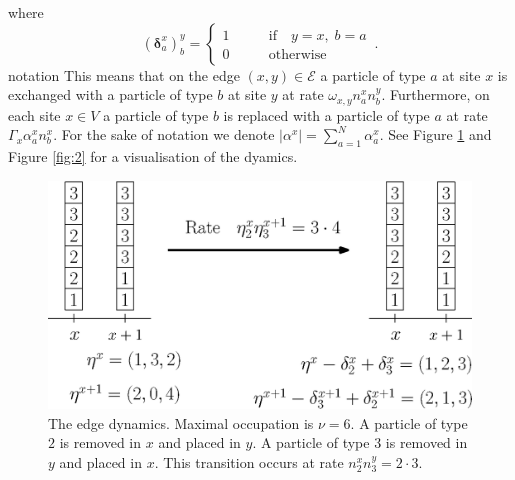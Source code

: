 \documentclass[10pt]{article}
\numberwithin{equation}{section}
\numberwithin{equation}{subsection}
\begin{document}
where 
\begin{equation}
(\bm{\delta}_{a}^{x})^{y}_{b}=\begin{cases}
1\qquad &\text{if}\quad y=x,\;b=a\\
0\qquad &\text{otherwise}
\end{cases}\,.
\end{equation}
{\color{red} notation}
This means that on the edge $(x,y)\in \mathcal{E}$  a particle of type $a$ at site $x$ is exchanged with a particle of type $b$ at site $y$ at rate $\omega_{x,y}n_{a}^{x}n_{b}^{y}$. Furthermore, on each site $x\in V$  a particle of type $b$ is replaced with a particle of type $a$ at rate $\Gamma_{x}\alpha_{a}^{x}n_{b}^{x}$. For the sake of notation we denote $|\alpha^{x}|=\sum_{a=1}^{N}\alpha_{a}^{x}$. 
See Figure \ref{fig:1} and  Figure \ref{fig:2} for a visualisation of the dyamics. 
\begin{figure}
    \centering
    \includegraphics[scale=0.45]{BulkStirring.eps}
    \caption{The edge dynamics. Maximal occupation is $\nu=6$. A particle of type $2$ is removed in $x$ and placed in $y$. A particle of type $3$ is removed in $y$ and placed in $x$. This transition occurs at rate $n_{2}^{x}n_{3}^{y}=2\cdot 3$.}
    \label{fig:1}
\end{figure}
\end{document}
